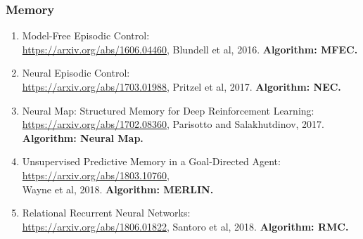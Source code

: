 \documentclass[lang=cn,11pt,a4paper]{eleganttemplate}
\begin{document}
\subsubsection{Memory}
\begin{enumerate}
    \item Model-Free Episodic Control:\\ \href{https://arxiv.org/abs/1606.04460}{https://arxiv.org/abs/1606.04460}, Blundell et al, 2016. \textbf{Algorithm: MFEC.}
    \item Neural Episodic Control:\\ \href{https://arxiv.org/abs/1703.01988}{https://arxiv.org/abs/1703.01988}, Pritzel et al, 2017. \textbf{Algorithm: NEC.}
    \item Neural Map: Structured Memory for Deep Reinforcement Learning:\\ \href{https://arxiv.org/abs/1702.08360}{https://arxiv.org/abs/1702.08360}, Parisotto and Salakhutdinov, 2017. \textbf{Algorithm: Neural Map.}
    \item Unsupervised Predictive Memory in a Goal-Directed Agent:\\ \href{https://arxiv.org/abs/1803.10760}{https://arxiv.org/abs/1803.10760}, \\ Wayne et al, 2018. \textbf{Algorithm: MERLIN.}
    \item Relational Recurrent Neural Networks:\\ \href{https://arxiv.org/abs/1806.01822}{https://arxiv.org/abs/1806.01822}, Santoro et al, 2018. \textbf{Algorithm: RMC.}
\end{enumerate}
\end{document}
